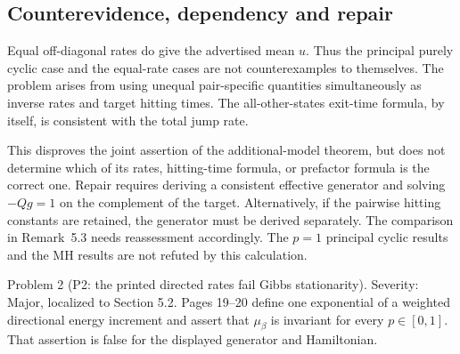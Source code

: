 \documentclass[10pt]{article}
\begin{document}
\subsection*{Counterevidence, dependency and repair}
Equal off-diagonal rates do give the advertised mean \(u\). Thus the principal purely cyclic case and the equal-rate cases are not counterexamples to themselves. The problem arises from using unequal pair-specific quantities simultaneously as inverse rates and target hitting times. The all-other-states exit-time formula, by itself, is consistent with the total jump rate.\par
This disproves the joint assertion of the additional-model theorem, but does not determine which of its rates, hitting-time formula, or prefactor formula is the correct one. Repair requires deriving a consistent effective generator and solving \(-Qg=1\) on the complement of the target. Alternatively, if the pairwise hitting constants are retained, the generator must be derived separately. The comparison in Remark 5.3 needs reassessment accordingly. The \(p=1\) principal cyclic results and the MH results are not refuted by this calculation.\par
Problem 2 (P2: the printed directed rates fail Gibbs stationarity).  Severity: Major, localized to Section 5.2. Pages 19–20 define one exponential of a weighted directional energy increment and assert that \(\mu_\beta\) is invariant for every \(p\in[0,1]\). That assertion is false for the displayed generator and Hamiltonian.\par
\end{document}
